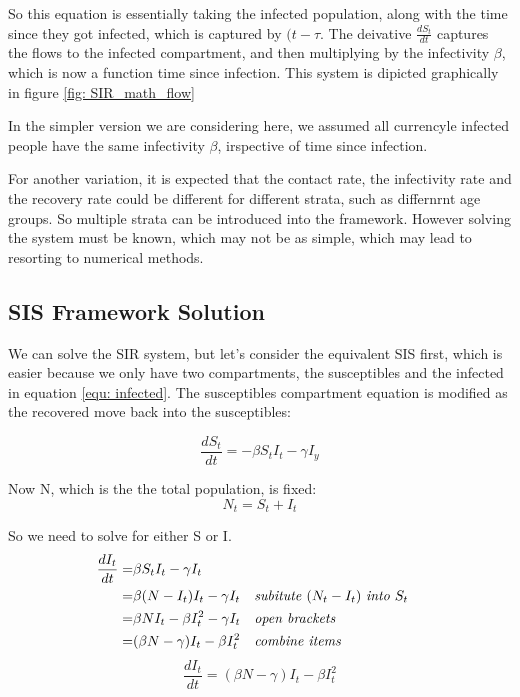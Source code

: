 \documentclass[fontsize=17pt]{article}
\begin{document}
So this equation is essentially taking the infected population, along with the time since they got infected, which is captured by $(t-\tau$. The deivative $\frac{dS_{t}}{dt}$ captures the flows to the infected compartment, and then multiplying by the infectivity $\beta$, which is now a function time since infection. This system is dipicted graphically in figure \ref{fig: SIR_math_flow}

In the simpler version we are considering here, we assumed all currencyle infected people have the same infectivity $\beta$, irspective of time since infection.

For another variation, it is expected that the contact rate, the infectivity rate and the recovery rate could be different for different strata, such as differnrnt age groups. So multiple strata can be introduced into the framework. However solving the system must be known, which may not be as simple, which may lead to resorting to numerical methods.


\subsection{SIS Framework Solution}\label{sec: SIS_solution}
We can solve the SIR system, but let's consider the equivalent SIS first, which is easier because we only have two compartments, the susceptibles and the infected in equation \ref{equ: infected}. The susceptibles compartment equation is modified as the recovered move back into the susceptibles: 

\begin{equation}
\frac{dS_{t}}{dt}=-\beta S_{t}I_{t}-\gamma I_{y}
\end{equation}

Now N, which is the the total population, is fixed:
\begin{equation}
N_{t}=S_{t}+I_{t}
\end{equation}

So we need to solve for either S or I.
 \begin{align*}
\frac{dI_{t}}{dt}=&\beta S_{t}I_{t}-\gamma I_{t} \\
=&\beta (N-I_{t})I_{t}-\gamma I_{t} && \text{\textit{subitute} }(N_{t}-I_{t})\text{ \textit{into} }S_{t}\\
=&\beta NI_{t}-\beta I_{t}^{2}-\gamma I_{t} && \text{\textit{open brackets}}\\
=&(\beta N-\gamma)I_{t}-\beta I_{t}^{2}&& \text{\textit{combine items}}
\end{align*}
 \begin{equation}\label{equ: bernoulli}
\frac{dI_{t}}{dt}=(\beta N-\gamma)I_{t}-\beta I_{t}^{2}
\end{equation}
\end{document}
